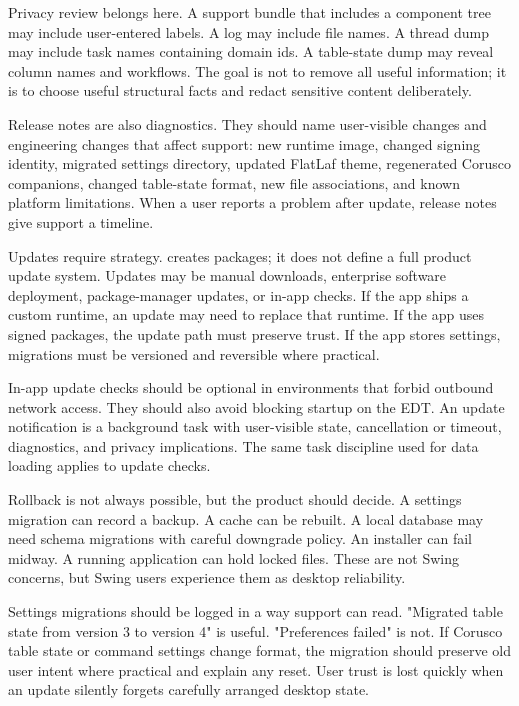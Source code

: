 Privacy review belongs here. A support bundle that includes a component tree may include user-entered labels. A log may include file names. A thread dump may include task names containing domain ids. A table-state dump may reveal column names and workflows. The goal is not to remove all useful information; it is to choose useful structural facts and redact sensitive content deliberately.

Release notes are also diagnostics. They should name user-visible changes and engineering changes that affect support: new runtime image, changed signing identity, migrated settings directory, updated FlatLaf theme, regenerated Corusco companions, changed table-state format, new file associations, and known platform limitations. When a user reports a problem after update, release notes give support a timeline.

Updates require strategy.  creates packages; it does not define a full product update system. Updates may be manual downloads, enterprise software deployment, package-manager updates, or in-app checks. If the app ships a custom runtime, an update may need to replace that runtime. If the app uses signed packages, the update path must preserve trust. If the app stores settings, migrations must be versioned and reversible where practical.

In-app update checks should be optional in environments that forbid outbound network access. They should also avoid blocking startup on the EDT. An update notification is a background task with user-visible state, cancellation or timeout, diagnostics, and privacy implications. The same task discipline used for data loading applies to update checks.

Rollback is not always possible, but the product should decide. A settings migration can record a backup. A cache can be rebuilt. A local database may need schema migrations with careful downgrade policy. An installer can fail midway. A running application can hold locked files. These are not Swing concerns, but Swing users experience them as desktop reliability.

Settings migrations should be logged in a way support can read. "Migrated table state from version 3 to version 4" is useful. "Preferences failed" is not. If Corusco table state or command settings change format, the migration should preserve old user intent where practical and explain any reset. User trust is lost quickly when an update silently forgets carefully arranged desktop state.

